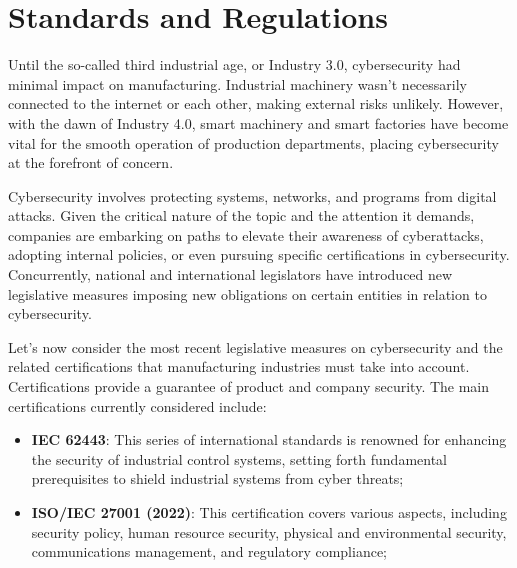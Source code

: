 \chapter{Standards and Regulations}
\label{cha:standards}

Until the so-called third industrial age, or Industry 3.0, cybersecurity had minimal impact on manufacturing. Industrial machinery wasn't necessarily connected to the internet or each other, making external risks unlikely. However, with the dawn of Industry 4.0, smart machinery and smart factories have become vital for the smooth operation of production departments, placing cybersecurity at the forefront of concern.

Cybersecurity involves protecting systems, networks, and programs from digital attacks. Given the critical nature of the topic and the attention it demands, companies are embarking on paths to elevate their awareness of cyberattacks, adopting internal policies, or even pursuing specific certifications in cybersecurity. Concurrently, national and international legislators have introduced new legislative measures imposing new obligations on certain entities in relation to cybersecurity.

Let's now consider the most recent legislative measures on cybersecurity and the related certifications that manufacturing industries must take into account.\\
Certifications provide a guarantee of product and company security. The main certifications currently considered include:
\begin{itemize}
  \item \textbf{IEC 62443}: This series of international standards is renowned for enhancing the security of industrial control systems, setting forth fundamental prerequisites to shield industrial systems from cyber threats;
  \item \textbf{ISO/IEC 27001 (2022)}: This certification covers various aspects, including security policy, human resource security, physical and environmental security, communications management, and regulatory compliance;
\end{itemize}

